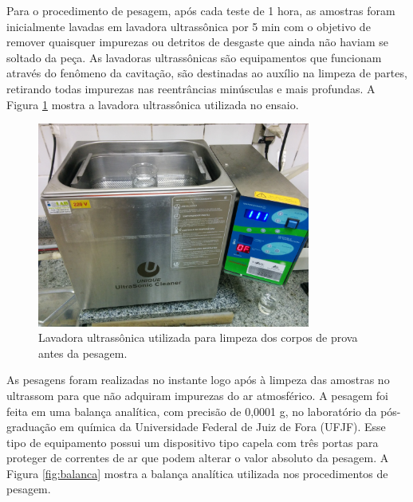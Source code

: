 \documentclass[
12pt,
openany, %
oneside, %
a4paper,			
english,			
brazil			        %
]{abntbibufjf}
\begin{document}
	
	Para o procedimento de pesagem, após cada teste de 1 hora, as amostras foram inicialmente lavadas em lavadora ultrassônica por 5 min com o objetivo de remover quaisquer impurezas ou detritos de desgaste que ainda não haviam se soltado da peça. As lavadoras ultrassônicas são equipamentos que funcionam através do fenômeno da cavitação, são destinadas ao auxílio na limpeza de partes, retirando todas impurezas nas reentrâncias minúsculas e mais profundas. A Figura \ref{fig:ultrassom} mostra a lavadora ultrassônica utilizada no ensaio.
	
	\begin{figure}[H]
		\centering
		\includegraphics[width=0.8\textwidth]{ultrassom}
		\caption{Lavadora ultrassônica utilizada para limpeza dos corpos de prova antes da pesagem.}
		\label{fig:ultrassom}
	\end{figure}
	
	As pesagens foram realizadas no instante logo após à limpeza das amostras no ultrassom para que não adquiram impurezas do ar atmosférico. A pesagem foi feita em uma balança analítica, com precisão de 0,0001 g, no laboratório da pós-graduação em química da Universidade Federal de Juiz de Fora (UFJF). Esse tipo de equipamento possui um dispositivo tipo capela com três portas para proteger de correntes de ar que podem alterar o valor absoluto da pesagem. A Figura \ref{fig:balanca} mostra a balança analítica utilizada nos procedimentos de pesagem.
	
\end{document}

